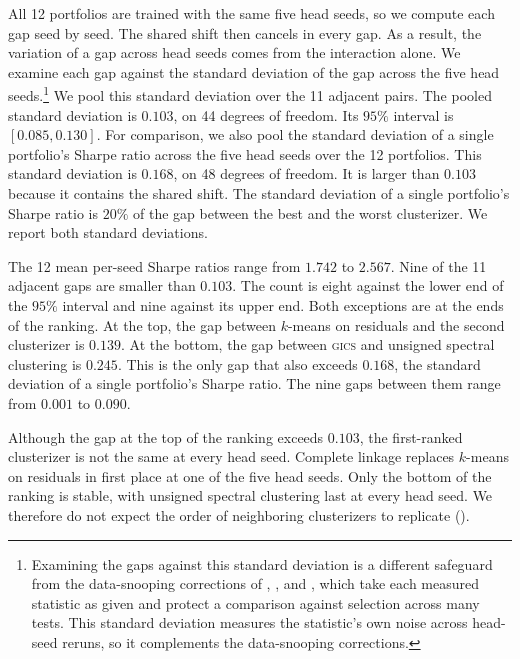 All 12 portfolios are trained with the same five head seeds, so we compute each gap seed by seed. The shared shift then cancels in every gap. As a result, the variation of a gap across head seeds comes from the interaction alone. We examine each gap against the standard deviation of the gap across the five head seeds.\footnote{Examining the gaps
against this standard deviation is a different safeguard from the data-snooping
corrections of \citet{white2000reality},
\citet{hansen2011mcs}, and \citet{bailey2014deflated}, which take each measured
statistic as given and protect a comparison against selection across many
tests. This standard deviation measures the statistic's own noise across
head-seed reruns, so it complements the data-snooping corrections.} We pool this standard deviation over the 11 adjacent pairs. The pooled standard deviation is $0.103$, on 44 degrees of freedom. Its $95\%$ interval is $[0.085, 0.130]$. For comparison, we also pool the standard deviation of a single portfolio's Sharpe ratio across the five head seeds over the 12 portfolios. This standard deviation is $0.168$, on 48 degrees of freedom. It is larger than $0.103$ because it contains the shared shift. The standard deviation of a single portfolio's Sharpe ratio is $20\%$ of the gap between the best and the worst clusterizer. We report both standard deviations.

The 12 mean per-seed Sharpe ratios range from $1.742$ to $2.567$. Nine of the
11 adjacent gaps are smaller than $0.103$. The count is eight against the lower
end of the $95\%$ interval and nine against its upper end. Both exceptions are
at the ends of the ranking. At the top, the gap between $k$-means on residuals and the second clusterizer is $0.139$. At the bottom, the gap between \textsc{gics} and unsigned spectral clustering is $0.245$. This is the only gap that also exceeds $0.168$, the standard deviation of a single portfolio's Sharpe ratio. The
nine gaps between them range from $0.001$ to $0.090$.

Although the gap at the top of the ranking exceeds $0.103$, the first-ranked clusterizer is not the same at every head seed. Complete linkage replaces $k$-means on residuals in first place at one of the five head seeds. Only the bottom of the ranking is stable, with unsigned spectral clustering last at every head seed. We therefore do not expect the order of neighboring clusterizers to
replicate ().

